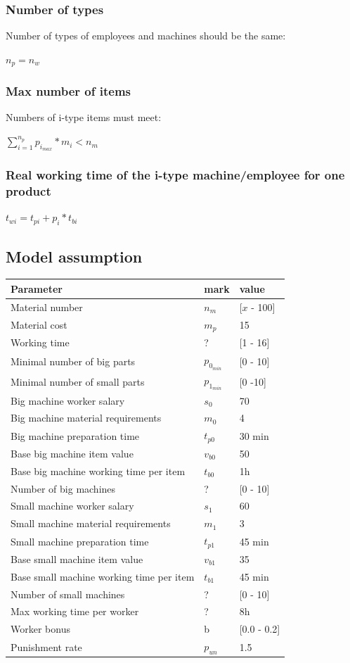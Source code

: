 \documentclass[a4paper]{article}
\begin{document}
\subsubsection{Number of types}

Number of types of employees and machines should be the same:

$n_p = n_w$

\subsubsection{Max number of items}\label{max-number-of-items}

Numbers of i-type items must meet:

$\sum^{n_p}_{i=1} p_{i_{max}} * m_i< n_m$

\subsubsection{Real working time of the i-type machine/employee for one
product}\label{real-working-time-of-the-i-type-machineemployee-for-one-product}

$t_{wi} = t_{pi} + p_i * t_{bi}$

\subsection{Model assumption}\label{model-assumption}

\begin{longtable}[c]{lll}
Parameter & mark & value\\ \hline
Material number & $n_m$ & [$x$ - 100]\\
Material cost & $m_p$ & 15\\
Working time & ? & {[}1 - 16{]}\\
Minimal number of big parts & $p_{0_{min}}$ & [0 - 10]\\
Minimal number of small parts & $p_{1_{min}}$ & [0 -10]\\
Big machine worker salary & $s_0$ & 70\\
Big machine material requirements & $m_0$ & 4\\
Big machine preparation time & $t_{p0}$ & 30 min\\
Base big machine item value & $v_{b0}$ & 50\\
Base big machine working time per item & $t_{b0}$ & 1h\\
Number of big machines & ? & [0 - 10]\\
Small machine worker salary & $s_1$ & 60\\
Small machine material requirements & $m_1$ & 3\\
Small machine preparation time & $t_{p1}$ & 45 min\\
Base small machine item value & $v_{b1}$ & 35\\
Base small machine working time per item & $t_{b1}$ & 45 min\\
Number of small machines & ? & [0 - 10]\\
Max working time per worker & ? & 8h\\
Worker bonus & b & [0.0 - 0.2]\\
Punishment rate & $p_{un}$ & 1.5
\end{longtable}
\end{document}
